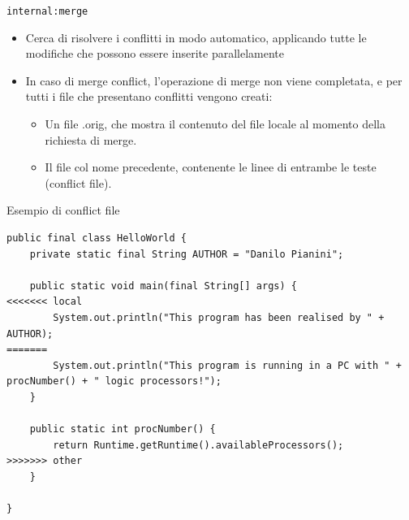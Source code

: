 \documentclass[presentation]{beamer}
\begin{document}
\begin{frame}[fragile]{\texttt{internal:merge}}
		\begin{itemize}
			\item Cerca di risolvere i conflitti in modo automatico, applicando tutte le modifiche che possono essere inserite parallelamente
			\item In caso di merge conflict, l'operazione di merge non viene completata, e per tutti i file che presentano conflitti vengono creati:
			\begin{itemize}
				\item Un file .orig, che mostra il contenuto del file locale al momento della richiesta di merge.
				\item Il file col nome precedente, contenente le linee di entrambe le teste (conflict file).
			\end{itemize}
		\end{itemize}
\end{frame}


\begin{frame}[fragile]{Esempio di conflict file}
	\begin{block}{}
		\tiny
		\begin{verbatim}
public final class HelloWorld {
    private static final String AUTHOR = "Danilo Pianini";

    public static void main(final String[] args) {
<<<<<<< local
        System.out.println("This program has been realised by " + AUTHOR);
=======
        System.out.println("This program is running in a PC with " + procNumber() + " logic processors!");
    }

    public static int procNumber() {
        return Runtime.getRuntime().availableProcessors();
>>>>>>> other
    }

}
		\end{verbatim}
	\end{block}
\end{frame}

\end{document}
